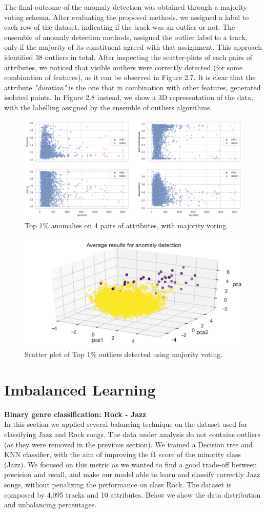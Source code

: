 The final outcome of the anomaly detection was obtained through a majority voting schema. After evaluating the proposed methods, we assigned a label to each row of the dataset, indicating if the track was an outlier or not. The ensemble of anomaly detection methods, assigned the outlier label to a track, only if the majority of its constituent agreed with that assignment. This approach identified 38 outliers in total. 
After inspecting the scatter-plots of each pairs of attributes, we noticed that visible outliers were correctly detected (for some combination of features), as it can be observed in Figure 2.7. 
It is clear that the attribute \textit{"duration"} is the one that in combination with other features, generated isolated points.
In Figure 2.8 instead, we show a 3D representation of the data, with the labelling assigned by the ensemble of outliers algorithms.
\begin{figure}[!htb]
  \centering
  \includegraphics[width=0.85\linewidth]{images/4scatter-anomaly_winner.png}
  \caption{Top 1\% anomalies on 4 pairs of attributes, with majority voting.}
 \end{figure} 

\begin{figure}[!htb]
  \centering 
  \includegraphics[width=0.37\linewidth]{images/winner-outliers.png}
  \caption{Scatter plot of Top 1\% outliers detected using majority voting.}
\end{figure}
\newpage
\section{Imbalanced Learning}
\textbf{Binary genre classification: Rock - Jazz}\\
In this section we applied several balancing technique on the dataset used for classifying Jazz and Rock songs. The data under analysis do not contains outliers (as they were removed in the previous section). 
We trained a Decision tree and KNN classifier, with the aim of improving the f1 score of the minority class (Jazz). We focused on this metric as we wanted to find a good trade-off between precision and recall, and make our model able to learn and classify correctly Jazz songs, without penalizing the performance on class Rock. The dataset is composed by 4,095 tracks and 10 attributes.  
Below we show the data distribution and unbalancing percentages.

